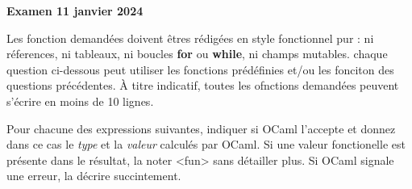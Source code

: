 \documentclass{report}
\begin{document}
\begin{center}
    \huge{\textbf{Examen 11 janvier 2024}}
\end{center}

Les fonction demandées doivent êtres rédigées en style fonctionnel pur : ni réferences,
ni tableaux, ni boucles \textbf{for} ou \textbf{while}, ni champs mutables. chaque question
ci-dessous peut utiliser les fonctions prédéfinies et/ou les fonciton des questions
précédentes. À titre indicatif, toutes les ofnctions demandées peuvent s'écrire en
moins de 10 lignes.

\begin{exo}
    Pour chacune des expressions suivantes, indiquer si OCaml l'accepte et donnez dans
    ce cas le \textit{type} et la \textit{valeur} calculés par OCaml. Si une valeur fonctionelle
    est présente dans le résultat, la noter <fun> sans détailler plus. Si OCaml
    signale une erreur, la décrire succintement.
    \begin{q}{1}
    \end{q}
    \begin{q}{2}
    \end{q}
    \begin{q}{3}
    \end{q}
    \begin{q}{4}
    \end{q}
    \begin{q}{5}
    \end{q}
    \begin{q}{6}
    \end{q}
    \begin{q}{7}
\end{q}
\end{exo}
\end{document}
